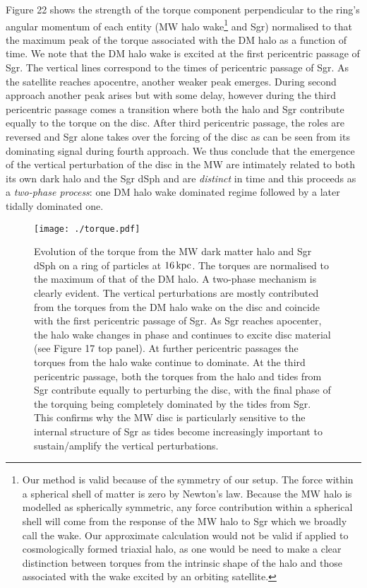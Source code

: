 \documentclass[useAMS,usenatbib]{mnras}
\begin{document}
Figure 22 shows the strength of the torque component perpendicular to the ring's angular momentum of each entity (MW halo wake\footnote{Our method is valid because of the symmetry of our setup. The force within a spherical shell of matter is zero by Newton's law. Because the MW halo is modelled as spherically symmetric, any force contribution within a spherical shell will come from the response of the MW halo to Sgr which we broadly call the wake. Our approximate calculation would not be valid if applied to cosmologically formed triaxial halo, as one would be need to make a clear distinction between torques from the intrinsic shape of the halo and those associated with the wake excited by an orbiting satellite.} and Sgr) normalised to that the maximum peak of the torque associated with the DM halo as a function of time. We note that the DM halo wake is excited at the first pericentric passage of Sgr. The vertical lines correspond to the times of pericentric passage of Sgr. %
As the satellite reaches apocentre, another weaker peak emerges. During second approach another peak arises but with some delay, however during the third pericentric passage comes a transition where both the halo and Sgr contribute equally to the torque on the disc. After third pericentric passage, the roles are reversed and Sgr alone takes over the forcing of the disc as can be seen from its dominating signal during fourth approach. We thus conclude that the emergence of the vertical perturbation of the disc in the MW are intimately related to both its own dark halo and the Sgr dSph and are {\it distinct} in time and this proceeds as a {\it two-phase process}: one DM halo wake dominated regime followed by a later tidally dominated one.

\begin{figure}
\texttt{[image: ./torque.pdf]}
\caption[]{Evolution of the torque from the MW dark matter halo and Sgr dSph on a ring of particles at $16\, \rm{kpc}$. The torques are normalised to the maximum of that of the DM halo. A two-phase mechanism is clearly evident. The vertical perturbations are mostly contributed from the torques from the DM halo wake on the disc and coincide with the first pericentric passage of Sgr. As Sgr reaches apocenter, the halo wake changes in phase and continues to excite disc material (see Figure 17 top panel). At further pericentric passages the torques from the halo wake continue to dominate. At the third pericentric passage, both the torques from the halo and tides from Sgr contribute equally to perturbing the disc, with the final phase of the torquing being completely dominated by the tides from Sgr. This confirms why the MW disc is particularly sensitive to the internal structure of Sgr as tides become increasingly important to sustain/amplify the vertical perturbations. }
\end{figure}
\end{document}
